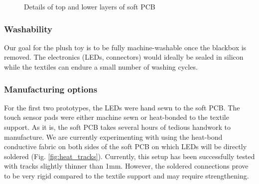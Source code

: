 \begin{figure}[H]
    \centering
    \hfill
    \hfill
    \caption{Details of top and lower layers of soft PCB} 
    \label{fig:soft_pcb}
\end{figure}

\subsubsection{Washability} Our goal for the plush toy is to be fully machine-washable once the blackbox is removed. The electronics (LEDs, connectors) would ideally be sealed in silicon while the textiles can endure a small number of washing cycles.

\subsubsection{Manufacturing options} For the first two prototypes, the LEDs were hand sewn to the soft PCB. The touch sensor pads were either machine sewn or heat-bonded to the textile support. As it is, the soft PCB takes several hours of tedious handwork to manufacture. We are currently experimenting with using the heat-bond conductive fabric on both sides of the soft PCB on which LEDs will be directly soldered (Fig. \ref{fig:heat_tracks}). Currently, this setup has been successfully tested with tracks slightly thinner than 1mm. However, the soldered connections prove to be very rigid compared to the textile support and may require strengthening.

